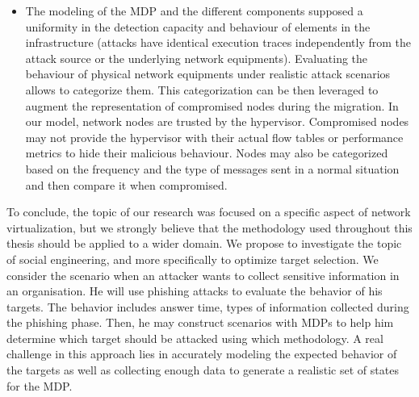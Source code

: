 \begin{itemize}
    \item 
    The modeling of the MDP and the different components supposed a uniformity in the detection capacity and behaviour of elements in the infrastructure (\eg attacks have identical execution traces independently from the attack source or the underlying network equipments). Evaluating the behaviour of physical network equipments under realistic attack scenarios allows to categorize them. This categorization can be then leveraged to augment the representation of compromised nodes during the migration. In our model, network nodes are trusted by the hypervisor. Compromised nodes may not provide the hypervisor with their actual flow tables or performance metrics to hide their malicious behaviour. Nodes may also be categorized based on the frequency and the type of messages sent in a normal situation and then compare it when compromised. 
    
\end{itemize}



To conclude, the topic of our research was focused on a specific aspect of network virtualization, but we strongly believe that the methodology used throughout this thesis should be applied to a wider domain. We propose to investigate the topic of social engineering, and more specifically to optimize target selection. We consider the scenario when an attacker wants to collect sensitive information in an organisation. He will use phishing attacks to evaluate the behavior of his targets. The behavior includes answer time, types of information collected during the phishing phase. Then, he may construct scenarios with MDPs to help him determine which target should be attacked using which methodology.
A real challenge in this approach lies in accurately modeling the expected behavior of the targets as well as collecting enough data to generate a realistic set of states for the MDP.